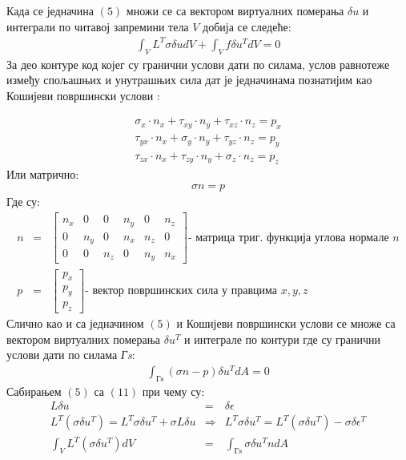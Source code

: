 \documentclass[11pt, a4paper]{article}
\begin{document}
Када се једначина $(5)$ множи се са вектором виртуалних померања $\delta u$ и интеграли по читавој запремини тела $V$ добија се следеће:
\begin{eqnarray}
\int _{V} L^T  \sigma \delta u d V + \int_{V} f \delta u^T dV = 0 
\end{eqnarray}
За део контуре код којег су гранични услови дати по силама, услов равнотеже између спољашњих и унутрашњих сила дат је једначинама познатијим као Кошијеви површински услови \cite{otpornost}:

\begin{eqnarray}
\sigma_x \cdot n_x + \tau_{xy} \cdot n_y + \tau_{xz} \cdot n_z = p_x \\
\tau_{yx} \cdot n_x + \sigma_{y} \cdot n_y + \tau_{yz} \cdot n_z = p_y \\
\tau_{zx} \cdot n_x + \tau_{zy} \cdot n_y + \sigma_{z} \cdot n_z = p_z
\end{eqnarray}
Или матрично:
\begin{eqnarray}
\sigma n = p
\end{eqnarray}
Где су:
\begin{eqnarray*}
n &=& \begin{bmatrix}
n_x & 0 & 0 & n_y & 0 & n_z\\
0 & n_y & 0 & n_x & n_z & 0\\
0 & 0 & n_z & 0 & n_y & n_x
\end{bmatrix} 
\text{- матрица триг. функција углова нормале }n \\
p &=& \begin{bmatrix}
p_x\\
p_y\\
p_z
\end{bmatrix}
\text{- вектор површинских сила у правцима } x,y,z
\end{eqnarray*}
Слично као и са једначином $(5)$ и Кошијеви површински услови се множе са вектором виртуалних померања $\delta u^T$ и интеграле по контури где су гранични услови дати по силама \textit{Гs}:
\begin{align}
\int_{\text{Гs}} (\sigma n -p) \delta u^T dA = 0 \label{Equ:C}
\end{align}
Сабирањем $(5)$ са $(11)$ при чему су:
\begin{eqnarray}
L \delta u &=& \delta \epsilon \\
L^T(\sigma \delta u^T) = L^T \sigma \delta u^T + \sigma L \delta u &\Rightarrow&  L^T \sigma \delta u^T = L^T (\sigma \delta u^T) - \sigma \delta \epsilon^T \\
\int_V L^T (\sigma \delta u^T)dV &=& \int_{\text {Гs}} \sigma \delta u^T n dA
\end{eqnarray}
\end{document}

